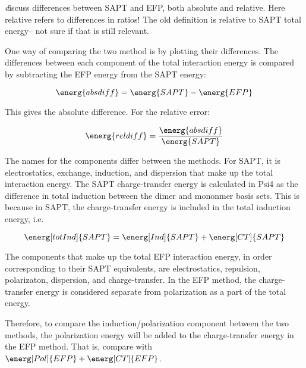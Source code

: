 



{\emph
    discuss differences between SAPT and EFP, both absolute and relative. 
    Here relative refers to differences in ratios! The old definition is relative to SAPT total energy-- not sure if that is still relevant.
}

One way of comparing the two method is by plotting their differences.
The differences between each component of the total interaction energy is compared by subtracting the EFP energy from the SAPT energy:

\begin{equation*}
    \energ{abs diff} = \energ{SAPT} - \energ{EFP}
\end{equation*}

This gives the absolute difference. 
For the relative error: 

\begin{equation*}
    \energ{rel diff} = \frac{ \energ{abs diff} } { \energ{SAPT} }
\end{equation*}


The names for the components differ between the methods. 
For SAPT, it is electrostatics, exchange, induction, and dispersion that make up the total interaction energy. 
The SAPT charge-transfer energy is calculated in Psi4 as the difference in total induction between the dimer and mononmer basis sets. 
This is because in SAPT, the charge-transfer energy is included in the total induction energy, i.e.

\begin{equation*}
    \energ[tot Ind]{SAPT} = \energ[Ind]{SAPT} + \energ[CT]{SAPT}
\end{equation*}


The components that make up the total EFP interaction energy, in order corresponding to their SAPT equivalents, are electrostatics, repulsion, polarizaton, dispersion, and charge-transfer. 
In the EFP method, the charge-transfer energy is considered separate from polarization as a part of the total energy. 

Therefore, to compare the induction/polarization component between the two methods, the polarization energy will be added to the charge-transfer energy in the EFP method. 
That is, compare 
 with
$ \energ[Pol]{EFP} + \energ[CT]{EFP} $.


